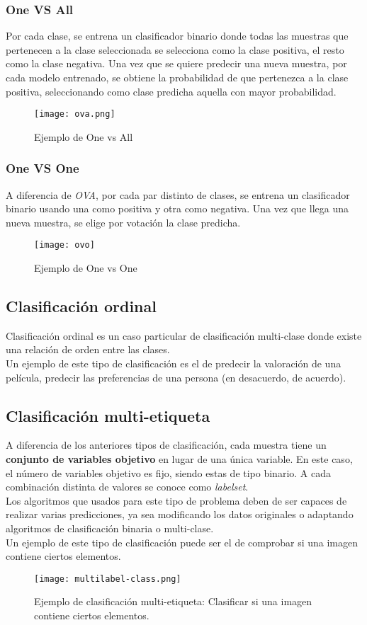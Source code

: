 \subsubsection*{One VS All}
Por cada clase, se entrena un clasificador binario donde todas las muestras que pertenecen a la clase seleccionada se selecciona como la clase positiva, el resto como la clase negativa. Una vez que se quiere predecir una nueva muestra, por cada modelo entrenado, se obtiene la probabilidad de que pertenezca a la clase positiva, seleccionando como clase predicha aquella con mayor probabilidad.
\begin{figure}[H]
	\centering
	\texttt{[image: ova.png]}
	\caption{Ejemplo de One vs All}
	\label{fig:ova}
\end{figure}
\subsubsection*{One VS One}
A diferencia de \textit{OVA}, por cada par distinto de clases, se entrena un clasificador binario usando una como positiva y otra como negativa. Una vez que llega una nueva muestra, se elige por votación la clase predicha.
\begin{figure}[H]
	\centering
	\texttt{[image: ovo]}
	\caption{Ejemplo de One vs One}
	\label{fig:ovo}
\end{figure}
\subsection{Clasificación ordinal}
Clasificación ordinal es un caso particular de clasificación multi-clase donde existe una relación de orden entre las clases.\\
Un ejemplo de este tipo de clasificación es el de predecir la valoración de una película, predecir las preferencias de una persona (en desacuerdo, de acuerdo).
\subsection{Clasificación multi-etiqueta}
\label{sec:ml}
A diferencia de los anteriores tipos de clasificación, cada muestra tiene un \textbf{conjunto de variables objetivo} en lugar de una única variable. En este caso, el número de variables objetivo es fijo, siendo estas de tipo binario. A cada combinación distinta de valores se conoce como \textit{labelset}.\\
Los algoritmos que usados para este tipo de problema deben de ser capaces de realizar varias predicciones, ya sea modificando los datos originales o adaptando algoritmos de clasificación binaria o multi-clase.\\
\linebreak
Un ejemplo de este tipo de clasificación puede ser el de comprobar si una imagen contiene ciertos elementos.
\begin{figure}[H]
	\centering
	\texttt{[image: multilabel-class.png]}
	\caption{Ejemplo de clasificación multi-etiqueta: Clasificar si una imagen contiene ciertos elementos.}
	\label{fig:mlclasss}
\end{figure}
